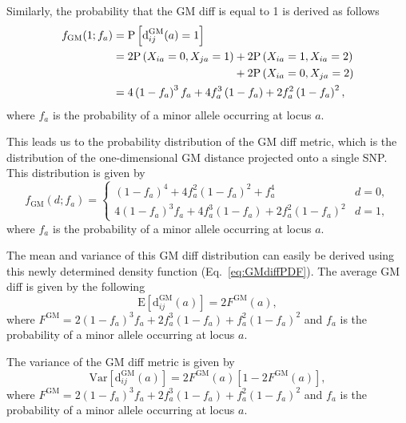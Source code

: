 \documentclass[aoas]{imsart}
\begin{document}
Similarly, the probability that the GM diff is equal to 1 is derived as follows
%
\begin{equation}\label{eq:probGM1}
\begin{aligned}
f_\text{GM}(1;f_a) &= \text{P}\left[\text{d}^\text{GM}_{ij}(a) = 1\right]\\
&= 2\text{P}\left(X_{ia}=0,X_{ja}=1\right) + 2\text{P}\left(X_{ia}=1,X_{ia}=2\right) \\
& \hspace{3.81cm} + 2\text{P}\left(X_{ia}=0,X_{ja}=2\right) \\
&= 4\left(1 - f_a\right)^3 f_a + 4 f^3_a \left(1 - f_a\right) + 2 f^2_a \left(1 - f_a\right)^2,
\end{aligned}
\end{equation}
%
where $f_a$ is the probability of a minor allele occurring at locus $a$.

This leads us to the probability distribution of the GM diff metric, which is the distribution of the one-dimensional GM distance projected onto a single SNP. This distribution is given by
%
\begin{equation}\label{eq:GMdiffPDF}
f_\text{GM}(d;f_a) = \begin{cases}
\left(1 - f_a\right)^4 + 4 f^2_a \left(1 - f_a\right)^2 + f^4_a & d=0, \\
4\left(1 - f_a\right)^3 f_a + 4 f^3_a \left(1 - f_a\right) + 2 f^2_a \left(1 - f_a\right)^2 & d=1,
\end{cases}
\end{equation}
%
where $f_a$ is the probability of a minor allele occurring at locus $a$. 

The mean and variance of this GM diff distribution can easily be derived using this newly determined density function (Eq.~\ref{eq:GMdiffPDF}). The average GM diff is given by the following
%
\begin{equation}\label{eq:GMdiffMean}
\text{E}\left[\text{d}^\text{GM}_{ij}(a)\right] = 2 F^\text{GM}(a),
\end{equation}
%
where $F^\text{GM} = 2 \left(1 - f_a\right)^3 f_a + 2 f^3_a \left(1 - f_a\right) + f^2_a \left(1 - f_a\right)^2$ and $f_a$ is the probability of a minor allele occurring at locus $a$.

The variance of the GM diff metric is given by
%
\begin{equation}\label{eq:GMdiffVar}
\text{Var}\left[\text{d}^\text{GM}_{ij}(a)\right] = 2 F^\text{GM}(a)\left[1 - 2 F^\text{GM}(a)\right],
\end{equation}
%
where $F^\text{GM} = 2 \left(1 - f_a\right)^3 f_a + 2 f^3_a \left(1 - f_a\right) + f^2_a \left(1 - f_a\right)^2$ and $f_a$ is the probability of a minor allele occurring at locus $a$.
\end{document}

